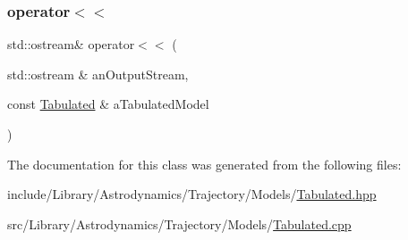 \subsubsection{\texorpdfstring{operator$<$$<$}{operator<<}}
{\footnotesize\ttfamily std\+::ostream\& operator$<$$<$ (\begin{DoxyParamCaption}\item[{std\+::ostream \&}]{an\+Output\+Stream,  }\item[{const \hyperlink{classlibrary_1_1astro_1_1trajectory_1_1models_1_1_tabulated}{Tabulated} \&}]{a\+Tabulated\+Model }\end{DoxyParamCaption})\hspace{0.3cm}{\ttfamily [friend]}}



The documentation for this class was generated from the following files\+:\begin{DoxyCompactItemize}
\item 
include/\+Library/\+Astrodynamics/\+Trajectory/\+Models/\hyperlink{_models_2_tabulated_8hpp}{Tabulated.\+hpp}\item 
src/\+Library/\+Astrodynamics/\+Trajectory/\+Models/\hyperlink{_models_2_tabulated_8cpp}{Tabulated.\+cpp}\end{DoxyCompactItemize}
